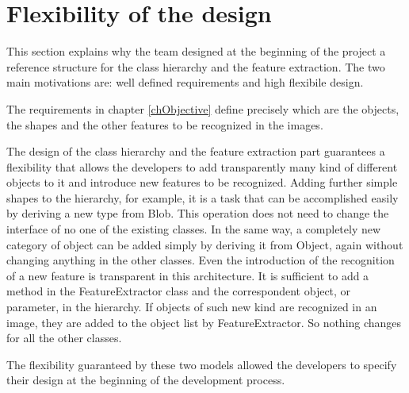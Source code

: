 	\section{Flexibility of the design}			
	This section explains why the team designed at the beginning of the project a reference structure for the class hierarchy and the feature extraction. The two main motivations are: well defined requirements and high flexibile design. 
	
	The requirements in chapter \ref{chObjective} define precisely which are the objects, the shapes and the other features to be recognized in the images.

	The design of the class hierarchy and the feature extraction part guarantees a flexibility that allows the developers to add transparently many kind of different objects to it and introduce new features to be recognized.
	Adding further simple shapes to the hierarchy, for example, it is a task that can be accomplished easily by deriving a new type from Blob. This operation does not need to change the interface of no one of the existing classes.
	In the same way, a completely new category of object can be added simply by deriving it from Object, again without changing anything in the other classes. 
	Even the introduction of the recognition of a new feature is transparent in this architecture. It is sufficient to add a method in the FeatureExtractor class and the correspondent object, or parameter, in the hierarchy. If objects of such new kind are recognized in an image, they are added to the object list by FeatureExtractor. So nothing changes for all the other classes.

	The flexibility guaranteed by these two models allowed the developers to specify their design at the beginning of the development process.

